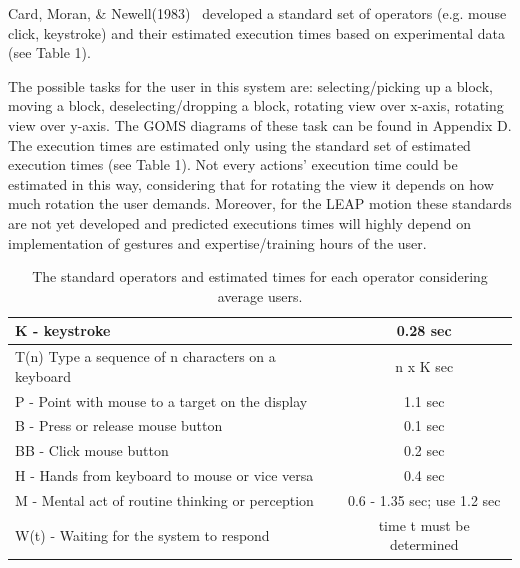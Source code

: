 Card, Moran, \& Newell(1983)~\cite{card1983psychology} developed a standard set of operators (e.g. mouse click, keystroke) and their estimated execution times based on experimental data (see Table 1). 

The possible tasks for the user in this system are: selecting/picking up a block, moving a block, deselecting/dropping a block, rotating view over x-axis, rotating view over y-axis. The GOMS diagrams of these task can be found in Appendix D. The execution times are estimated only using the standard set of estimated execution times (see Table 1). Not every actions' execution time could be estimated in this way, considering that for rotating the view it depends on how much rotation the user demands. Moreover, for the LEAP motion these standards are not yet developed and predicted executions times will highly depend on implementation of gestures and expertise/training hours of the user.


\begin{table} [H]
\centering
\begin{tabular}{|l|c|}
\hline
K - keystroke & 0.28 sec\\ \hline
T(n) Type a sequence of n characters on a keyboard & n x K sec \\ \hline
P - Point with mouse to a target on the display & 1.1 sec \\ \hline
B - Press or release mouse button & 0.1 sec \\ \hline
BB - Click mouse button & 0.2 sec \\ \hline
H - Hands from keyboard to mouse or vice versa & 0.4 sec \\  \hline
M - Mental act of routine thinking or perception & 0.6 - 1.35 sec; use 1.2 sec \\ \hline
W(t) - Waiting for the system to respond & time t must be determined \\ 
\hline
\end{tabular}
\caption{The standard operators and estimated times for each operator considering average users.}
\end{table}

